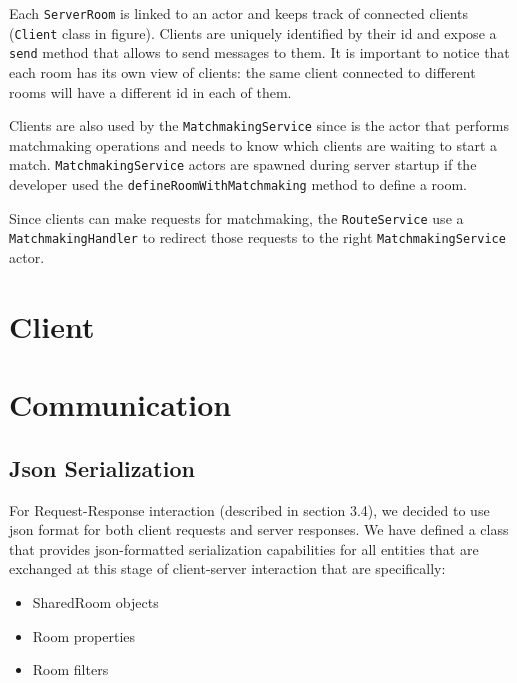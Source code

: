 Each \texttt{ServerRoom} is linked to an actor and keeps track of connected clients (\texttt{Client} class in figure). Clients are uniquely identified by their id and expose a \texttt{send} method that allows to send messages to them. It is important to notice that each room has its own view of clients: the same client connected to different rooms will have a different id in each of them. 

Clients are also used by the \texttt{MatchmakingService} since is the actor that performs matchmaking operations and needs to know which clients are waiting to start a match. \texttt{MatchmakingService} actors are spawned during server startup if the developer used the \texttt{defineRoomWithMatchmaking} method to define a room. 

Since clients can make requests for matchmaking, the \texttt{RouteService} use a \texttt{MatchmakingHandler} to redirect those requests to the right \texttt{MatchmakingService} actor.


\section{Client}

\section{Communication}\label{sec:communication_design}


\subsection{Json Serialization}
For Request-Response interaction (described in section 3.4), we decided to use json format for both client requests and server responses. We have defined a class that provides json-formatted serialization capabilities for all entities that are exchanged at this stage of client-server interaction that are specifically:
\begin{itemize}
	\item SharedRoom objects
	\item Room properties
	\item Room filters
\end{itemize}

